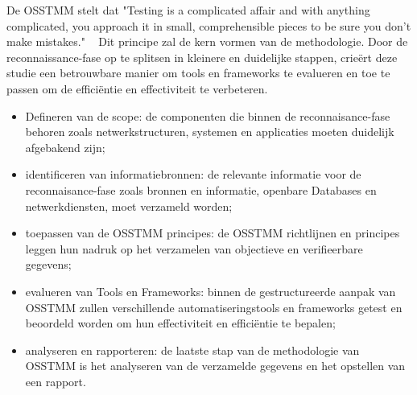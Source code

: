 De OSSTMM stelt dat "Testing is a complicated affair and with anything complicated, you approach it in small, comprehensible pieces to be sure you don’t make mistakes." ~\autocite{Herzog}
Dit principe zal de kern vormen van de methodologie. 
Door de reconnaissance-fase op te splitsen in kleinere en duidelijke stappen, crieërt deze studie een betrouwbare manier om tools en frameworks te evalueren en toe te passen om de efficiëntie en effectiviteit te verbeteren.

\begin{itemize}
    \item Defineren van de scope: 
    de componenten die binnen de reconnaisance-fase behoren zoals netwerkstructuren, systemen en applicaties moeten duidelijk afgebakend zijn;
    \item identificeren van informatiebronnen:
    de relevante informatie voor de reconnaisance-fase zoals bronnen en informatie, openbare Databases en netwerkdiensten, moet verzameld worden; 
    \item toepassen van de OSSTMM principes:
    de OSSTMM richtlijnen en principes leggen hun nadruk op het verzamelen van objectieve en verifieerbare gegevens;
    \item evalueren van Tools en Frameworks:
    binnen de gestructureerde aanpak van OSSTMM zullen verschillende automatiseringstools en frameworks getest en beoordeld worden om hun effectiviteit en efficiëntie te bepalen;
    \item analyseren en rapporteren:
    de laatste stap van de methodologie van OSSTMM is het analyseren van de verzamelde gegevens en het opstellen van een rapport.
\end{itemize}




